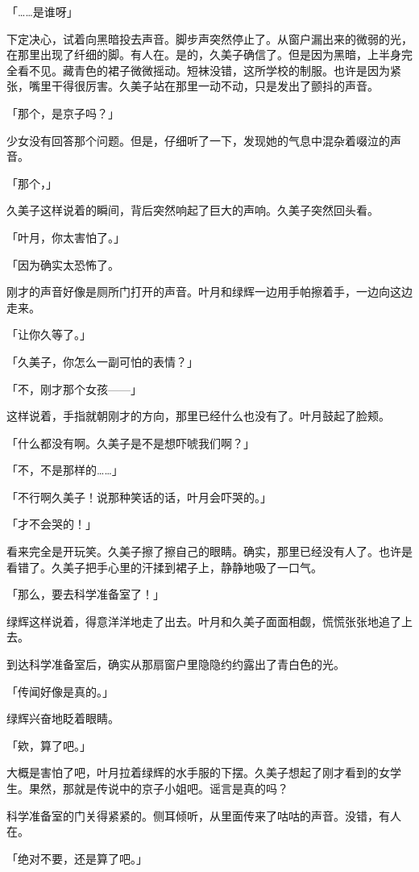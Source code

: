 \documentclass[UTF8]{ctexart}
\begin{document}
    「……是谁呀」

    下定决心，试着向黑暗投去声音。脚步声突然停止了。从窗户漏出来的微弱的光，在那里出现了纤细的脚。有人在。是的，久美子确信了。但是因为黑暗，上半身完全看不见。藏青色的裙子微微摇动。短袜没错，这所学校的制服。也许是因为紧张，嘴里干得很厉害。久美子站在那里一动不动，只是发出了颤抖的声音。

    「那个，是京子吗？」

    少女没有回答那个问题。但是，仔细听了一下，发现她的气息中混杂着啜泣的声音。

    「那个，」

    久美子这样说着的瞬间，背后突然响起了巨大的声响。久美子突然回头看。

    「叶月，你太害怕了。」

    「因为确实太恐怖了。

    刚才的声音好像是厕所门打开的声音。叶月和绿辉一边用手帕擦着手，一边向这边走来。

    「让你久等了。」

    「久美子，你怎么一副可怕的表情？」

    「不，刚才那个女孩——」

    这样说着，手指就朝刚才的方向，那里已经什么也没有了。叶月鼓起了脸颊。

    「什么都没有啊。久美子是不是想吓唬我们啊？」

    「不，不是那样的……」

    「不行啊久美子！说那种笑话的话，叶月会吓哭的。」

    「才不会哭的！」

    看来完全是开玩笑。久美子擦了擦自己的眼睛。确实，那里已经没有人了。也许是看错了。久美子把手心里的汗揉到裙子上，静静地吸了一口气。

    「那么，要去科学准备室了！」

    绿辉这样说着，得意洋洋地走了出去。叶月和久美子面面相觑，慌慌张张地追了上去。

    到达科学准备室后，确实从那扇窗户里隐隐约约露出了青白色的光。

    「传闻好像是真的。」

    绿辉兴奋地眨着眼睛。

    「欸，算了吧。」

    大概是害怕了吧，叶月拉着绿辉的水手服的下摆。久美子想起了刚才看到的女学生。果然，那就是传说中的京子小姐吧。谣言是真的吗？

    科学准备室的门关得紧紧的。侧耳倾听，从里面传来了咕咕的声音。没错，有人在。

    「绝对不要，还是算了吧。」
\end{document}
